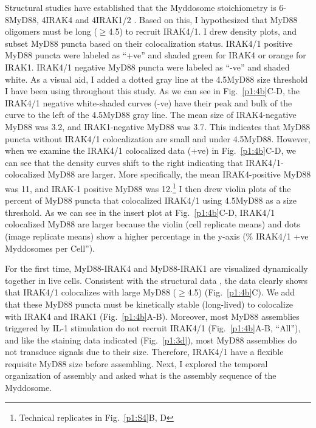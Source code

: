 Structural studies have established that the Myddosome stoichiometry is 6-8\times MyD88, 4\times IRAK4 and 4\times IRAK1/2 \autocite{Lin_2010}\autocite{Moncrieffe_2020}. Based on this, I hypothesized that MyD88 oligomers must be long ($\geq$4.5\times) to recruit IRAK4/1. I drew density plots, and subset MyD88 puncta based on their colocalization status. IRAK4/1 positive MyD88 puncta were labeled as “+ve” and shaded green for IRAK4 or orange for IRAK1. IRAK4/1 negative MyD88 puncta were labeled as “-ve” and shaded white. As a visual aid, I added a dotted gray line at the 4.5\times MyD88 size threshold I have been using throughout this study. As we can see in Fig.~\ref{p1:4b}C-D, the IRAK4/1 negative white-shaded curves (-ve) have their peak and bulk of the curve to the left of the 4.5\times MyD88 gray line. The mean size of IRAK4-negative MyD88 was 3.2\times, and IRAK1-negative MyD88 was 3.7\times. This indicates that MyD88 puncta without IRAK4/1 colocalization are small and under 4.5\times MyD88. However, when we examine the IRAK4/1 colocalized data (+ve) in Fig.~\ref{p1:4b}C-D, we can see that the density curves shift to the right indicating that IRAK4/1-colocalized MyD88 are larger. 
 More specifically, the mean IRAK4-positive MyD88 was 11\times, and IRAK-1 positive MyD88 was 12\times.\footnote{Technical replicates in Fig.~\ref{p1:S4}B, D} I then drew violin plots of the percent of MyD88 puncta that colocalized IRAK4/1 using 4.5\times MyD88 as a size threshold. As we can see in the insert plot at Fig.~\ref{p1:4b}C-D, IRAK4/1 colocalized MyD88 are larger because the violin (cell replicate means) and dots (image replicate means) show a higher percentage in the y-axis (\% IRAK4/1 +ve Myddosomes per Cell”).

For the first time, MyD88-IRAK4 and MyD88-IRAK1 are visualized dynamically together in live cells. Consistent with the structural data \autocite{Lin_2010}\autocite{Moncrieffe_2020}, the data clearly shows that IRAK4/1 colocalizes with large MyD88 ($\geq$4.5\times) (Fig.~\ref{p1:4b}C). We add that these MyD88 puncta must be kinetically stable (long-lived) to colocalize with IRAK4 and IRAK1 (Fig.~\ref{p1:4b}A-B). Moreover, most MyD88 assemblies triggered by IL-1 stimulation do not recruit IRAK4/1 (Fig.~\ref{p1:4b}A-B, “All”), and like the staining data indicated (Fig.~\ref{p1:3d}), most MyD88 assemblies do not transduce signals due to their size. Therefore, IRAK4/1 have a flexible requisite MyD88 size before assembling. Next, I explored the temporal organization of assembly and asked what is the assembly sequence of the Myddosome.


